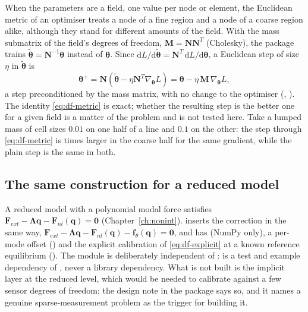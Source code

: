 When the parameters are a field, one value per node or element, the Euclidean metric of an optimiser treats a node of a fine region and a node of a coarse region alike, although they stand for different amounts of the field. With the mass submatrix of the field's degrees of freedom, $\bm M=\bm N\bm N^T$ (Cholesky), the package trains $\tilde{\bm\theta}=\bm N^{-1}\bm\theta$ instead of $\bm\theta$. Since $\mathrm dL/\mathrm d\tilde{\bm\theta}=\bm N^T\,\mathrm dL/\mathrm d\bm\theta$, a Euclidean step of size $\eta$ in $\tilde{\bm\theta}$ is
\begin{equation}\label{eq:df-metric}
\bm\theta^{+}=\bm N(\tilde{\bm\theta}-\eta\bm N^T\nabla_{\bm\theta}L)=\bm\theta-\eta\,\bm M\,\nabla_{\bm\theta}L,
\end{equation}
a step preconditioned by the mass matrix, with no change to the optimiser (, ). The identity \eqref{eq:df-metric} is exact; whether the resulting step is the better one for a given field is a matter of the problem and is not tested here. Take a lumped mass of cell sizes $0.01$ on one half of a line and $0.1$ on the other: the step through \eqref{eq:df-metric} is \adaMeshRatio{} times larger in the coarse half for the same gradient, while the plain step is the same in both.

\subsection{The same construction for a reduced model}\label{sec:df-rom}

A reduced model with a polynomial modal force satisfies $\bm F_{ext}-\bm\Lambda\bm q-\bm F_{nl}(\bm q)=\bm 0$ (Chapter~\ref{ch:nonint}). \rom{} inserts the correction in the same way, $\bm F_{ext}-\bm\Lambda\bm q-\bm F_{nl}(\bm q)-\bm f_\theta(\bm q)=\bm 0$, and has  (NumPy only), a per-mode offset () and the explicit calibration of \eqref{eq:df-explicit} at a known reference equilibrium (). The module is deliberately independent of \fea{}: \fea{} is a test and example dependency of \rom{}, never a library dependency. What is not built is the implicit layer at the reduced level, which would be needed to calibrate against a few sensor degrees of freedom; the design note in the package says so, and it names a genuine sparse-measurement problem as the trigger for building it.

